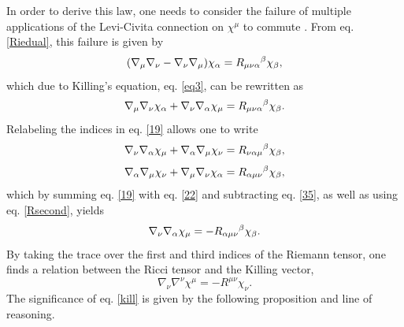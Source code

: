 \documentclass[
12pt,		%
openright,	%
twoside,  %
a4paper,			%
chapter=TITLE,		%
english,			%
french,				%
spanish,			%
brazil				%
]{USPSC-classe/USPSC}
\begin{document}
In order to derive this law, one needs to consider the failure of multiple applications of the Levi-Civita connection on $\chi^{\mu}$ to commute \cite{Dowker}. From eq. \ref{Riedual}, this failure is given by
\begin{equation}\label{eq39}
    (\nabla_{\mu}\nabla_{\nu}-\nabla_{\nu}\nabla_{\mu})\chi_{\alpha}=R_{\mu\nu\alpha}\mathstrut^{\beta}\chi_{\beta},
\end{equation}
which due to Killing's equation, eq. \ref{eq3}, can be rewritten as
\begin{equation}\label{19}
    \nabla_{\mu}\nabla_{\nu}\chi_{\alpha}+\nabla_{\nu}\nabla_{\alpha}\chi_{\mu}=R_{\mu\nu\alpha}\mathstrut^{\beta}\chi_{\beta}.
\end{equation}
Relabeling the indices in eq. \ref{19} allows one to write
\begin{equation}\label{22}
    \nabla_{\nu}\nabla_{\alpha}\chi_{\mu}+\nabla_{\alpha}\nabla_{\mu}\chi_{\nu}=R_{\nu\alpha\mu}\mathstrut^{\beta}\chi_{\beta},
\end{equation}
\begin{equation}\label{35}
    \nabla_{\alpha}\nabla_{\mu}\chi_{\nu}+\nabla_{\mu}\nabla_{\nu}\chi_{\alpha}=R_{\alpha\mu\nu}\mathstrut^{\beta}\chi_{\beta},
\end{equation}
which by summing eq. \ref{19} with eq. \ref{22} and subtracting eq. \ref{35}, as well as using eq. \ref{Rsecond}, yields
\begin{equation}\label{kr}
    \nabla_{\nu}\nabla_{\alpha}\chi_{\mu}=-R_{\alpha\mu\nu}\mathstrut^{\beta}\chi_{\beta}.
\end{equation}
By taking the trace over the first and third indices of the Riemann tensor, one finds a relation between the Ricci tensor and the Killing vector,
\begin{equation}\label{kill}
    \nabla_{\nu}\nabla^{\nu}\chi^{\mu}=-R^{\mu\nu}\chi_{\nu}.
\end{equation}
The significance of eq. \ref{kill} is given by the following proposition and line of reasoning.
\end{document}
